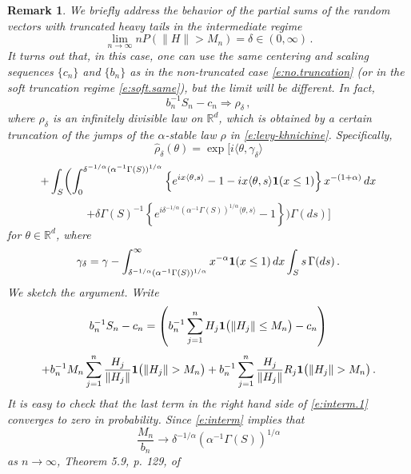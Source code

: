 \documentclass[11pt]{amsart}
\newtheorem{remark}{Remark}
\numberwithin{equation}{section}
\begin{document}
\begin{remark} \label{rk:interm}
{\rm We briefly address the behavior of the partial sums of the
random vectors with truncated heavy tails in the intermediate
regime
\begin{equation} \label{e:interm}
\lim_{n\rightarrow\infty}nP(\|H\|>M_n)=\delta\in(0,\infty)\,.
\end{equation}
It turns out that, in this case, one can use the same centering and
scaling sequences $\{c_n\}$ and $\{b_n\}$ as in the non-truncated case
\eqref{e:no.truncation} (or in the soft truncation regime
\eqref{e:soft.same}), but the limit will be different. In fact,
\begin{equation} \label{e:interm.limit}
b_n^{-1}S_n-c_n\Longrightarrow \rho_\delta\,,
\end{equation}
where $\rho_\delta$ is an infinitely divisible law on ${{\mathbb R}}^d$, which
is obtained by a certain truncation of the jumps of the
$\alpha$-stable law $\rho$ in \eqref{e:levy-khnichine}. Specifically,
\begin{equation} \label{e:rho.delta}
\hat\rho_\delta(\theta)=\exp\biggl[i\langle
\theta,\gamma_\delta\rangle
\end{equation}
$$
+\int_{S}\biggl(
\int_0^{\delta^{-1/\alpha}(\alpha^{-1}\Gamma(S))^{1/\alpha}}
\left\{e^{ix\langle
      \theta,s\rangle}-1-ix\langle \theta,s\rangle {{\bf 1}}(x\le
    1)\right\}x^{-(1+\alpha)}\, dx
$$
$$
+ \delta\Gamma(S)^{-1} \left\{ e^{i
\delta^{-1/\alpha}(\alpha^{-1}\Gamma(S))^{1/\alpha}
\langle \theta,s\rangle}-1\right\}
\biggr)\Gamma(ds)\biggr]
$$
for $\theta\in{{\mathbb R}}^d$, where
$$
\gamma_\delta = \gamma -
\int_{\delta^{-1/\alpha}(\alpha^{-1}\Gamma(S))^{1/\alpha}}^\infty
x^{-\alpha} {{\bf 1}}(x\le 1)\, dx \int_S s\, \Gamma(ds)\,.
$$
We sketch the argument. Write
\begin{equation}\label{e:interm.1}
b_n^{-1}S_n-c_n =
\left(b_n^{-1}\sum_{j=1}^nH_j{{\bf 1}}\bigl(\|H_j\|\le M_n\bigr)
-c_n\right)
\end{equation}
$$
+  b_n^{-1}M_n \sum_{j=1}^n
\frac{H_j}{\|H_j\|}{{\bf 1}}\bigl(\|H_j\|>M_n\bigr)
+ b_n^{-1} \sum_{j=1}^n
\frac{H_j}{\|H_j\|}R_j{{\bf 1}}\bigl(\|H_j\|>M_n\bigr)\,.
$$
It is easy to check that the last term in the right hand side of
\eqref{e:interm.1} converges to zero in probability. Since
\eqref{e:interm} implies that
\begin{equation}\label{e:ratio}
\frac{M_n}{b_n} \to
\delta^{-1/\alpha}(\alpha^{-1}\Gamma(S))^{1/\alpha}
\end{equation}
as $n\to\infty$,  Theorem 5.9, p. 129, of \cite{araujo:gine:1980}
}
\end{remark}
\end{document}
